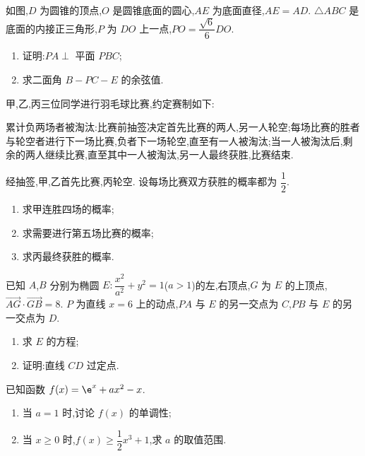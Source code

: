 \begin{problem}
如图,\(D\) 为圆锥的顶点,\(O\) 是圆锥底面的圆心,\(AE\) 为底面直径,\(AE=AD\). \(\triangle ABC\) 是底面的内接正三角形,\(P\) 为 \(DO\) 上一点,\(PO=\dfrac{\sqrt{6}}{6}DO\).

\begin{enumerate}
\item 证明:\(PA\perp\) 平面 \(PBC\);

\item 求二面角 \(B-PC-E\) 的余弦值.
\end{enumerate}

\end{problem}

\begin{problem}
甲,乙,丙三位同学进行羽毛球比赛,约定赛制如下:

累计负两场者被淘汰:比赛前抽签决定首先比赛的两人,另一人轮空;每场比赛的胜者与轮空者进行下一场比赛,负者下一场轮空,直至有一人被淘汰;当一人被淘汰后,剩余的两人继续比赛,直至其中一人被淘汰,另一人最终获胜,比赛结束.

经抽签,甲,乙首先比赛,丙轮空. 设每场比赛双方获胜的概率都为 \(\dfrac{1}{2}\).

\begin{enumerate}
\item 求甲连胜四场的概率;

\item 求需要进行第五场比赛的概率;

\item 求丙最终获胜的概率.
\end{enumerate}
\end{problem}

\begin{problem}
已知 \(A\),\(B\) 分别为椭圆 \(E:\dfrac{x^2}{a^2}+y^2=1\)(\(a>1\))的左,右顶点,\(G\) 为 \(E\) 的上顶点,\(\overrightarrow{AG}\cdot \overrightarrow{GB}=8\). \(P\) 为直线 \(x=6\) 上的动点,\(PA\) 与 \(E\) 的另一交点为 \(C\),\(PB\) 与 \(E\) 的另一交点为 \(D\).

\begin{enumerate}
\item 求 \(E\) 的方程;

\item 证明:直线 \(CD\) 过定点.
\end{enumerate}
\end{problem}

\begin{problem}
已知函数 \(f(x)=\e^x+ax^2-x\).

\begin{enumerate}
\item 当 \(a=1\) 时,讨论 \(f(x)\) 的单调性;

\item 当 \(x\ge 0\) 时,\(f(x)\ge \dfrac{1}{2}x^3+1\),求 \(a\) 的取值范围.
\end{enumerate}
\end{problem}

